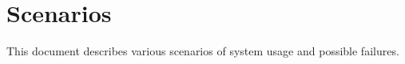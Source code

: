 
\newenvironment{scenario}[2]{%
	\newcommand{\case}[2]{%
			\paragraph{Beaviour in case ##1} \hfill \\
			##2
	}%
	\subsection{#2}\label{scenario:#1}
}{
}

\section{Scenarios}
\label{scenarios}
This document describes various scenarios of system usage and possible failures.

